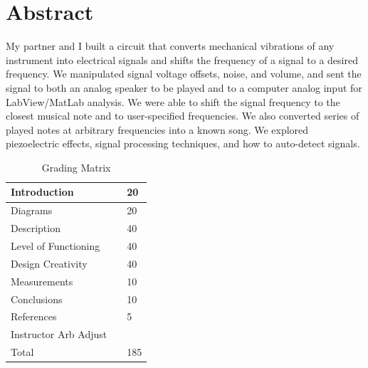 \documentclass{article}
\begin{document}
\section{Abstract}
    My partner and I built a circuit that converts mechanical vibrations of any instrument into electrical signals and shifts the frequency of a signal to a desired frequency. We manipulated signal voltage offsets, noise, and volume, and sent the signal to both an analog speaker to be played and to a computer analog input for LabView/MatLab analysis. We were able to shift the signal frequency to the closest musical note and to user-specified frequencies. We also converted series of played notes at arbitrary frequencies into a known song. We explored piezoelectric effects, signal processing techniques, and how to auto-detect signals.\\\begin{table}[H]
\centering
\caption{Grading Matrix}
\label{my-label}
\begin{tabular}{|l|l|l|}
\hline
Introduction &  & 20 \\ \hline
Diagrams &  & 20 \\ \hline
Description &  & 40 \\ \hline
Level of Functioning &  & 40 \\ \hline
Design Creativity &  & 40 \\ \hline
Measurements &  & 10 \\ \hline
Conclusions &  & 10 \\ \hline
References &  & 5 \\ \hline
Instructor Arb Adjust &  &  \\ \hline
Total &  & 185 \\ \hline
\end{tabular}
\end{table} \newpage
\end{document}
